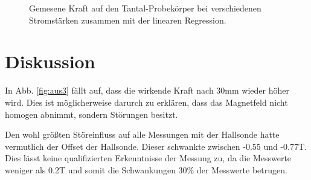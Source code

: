 \documentclass[12pt,a4paper,titlepage,headinclude,bibtotoc]{scrartcl}
\begin{document}
\begin{figure}[h]
\centering
{}
\caption{Gemesene Kraft auf den Tantal-Probekörper bei verschiedenen Stromstärken zusammen mit der linearen Regression.}
\label{fig:aus7}
\end{figure}

\section{Diskussion}
\label{sec:diskussion}
In Abb. \ref{fig:aus3} fällt auf, dass die wirkende Kraft nach 30mm wieder höher wird.
Dies ist möglicherweise darurch zu erklären, dass das Magnetfeld nicht homogen abnimmt, sondern Störungen besitzt.

Den wohl größten Störeinfluss auf alle Messungen mit der Hallsonde hatte vermutlich der Offset der Hallsonde.
Dieser schwankte zwischen -0.55 und -0.77T.
Dies lässt keine qualifizierten Erkenntnisse der Messung zu, da die Messwerte weniger als 0.2T und somit die Schwankungen 30\% der Messwerte betrugen.



\end{document}
